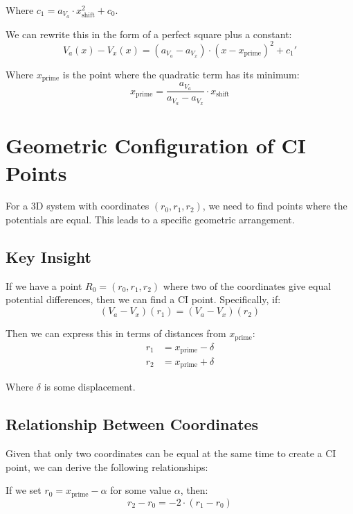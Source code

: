 \documentclass{article}
\begin{document}
Where $c_1 = a_{V_a} \cdot x_{\text{shift}}^2 + c_0$.

We can rewrite this in the form of a perfect square plus a constant:
\begin{equation}
V_a(x) - V_x(x) = (a_{V_a} - a_{V_x}) \cdot (x - x_{\text{prime}})^2 + c_1'
\end{equation}

Where $x_{\text{prime}}$ is the point where the quadratic term has its minimum:
\begin{equation}
x_{\text{prime}} = \frac{a_{V_a}}{a_{V_a} - a_{V_x}} \cdot x_{\text{shift}}
\end{equation}

\section{Geometric Configuration of CI Points}

For a 3D system with coordinates $(r_0, r_1, r_2)$, we need to find points where the potentials are equal. This leads to a specific geometric arrangement.

\subsection{Key Insight}

If we have a point $R_0 = (r_0, r_1, r_2)$ where two of the coordinates give equal potential differences, then we can find a CI point. Specifically, if:
\begin{equation}
(V_a - V_x)(r_1) = (V_a - V_x)(r_2)
\end{equation}

Then we can express this in terms of distances from $x_{\text{prime}}$:
\begin{align}
r_1 &= x_{\text{prime}} - \delta \\
r_2 &= x_{\text{prime}} + \delta
\end{align}

Where $\delta$ is some displacement.

\subsection{Relationship Between Coordinates}

Given that only two coordinates can be equal at the same time to create a CI point, we can derive the following relationships:

If we set $r_0 = x_{\text{prime}} - \alpha$ for some value $\alpha$, then:
\begin{equation}
r_2 - r_0 = -2 \cdot (r_1 - r_0)
\end{equation}
\end{document}
